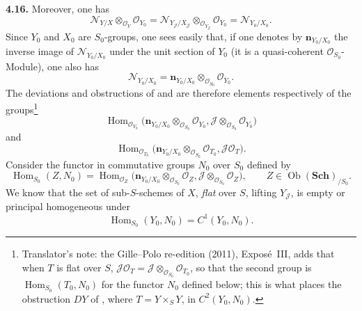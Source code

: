 \medskip
\noindent{}\textbf{4.16.}
Moreover, one has
\[
 \mathscr N_{Y/X}\otimes_{\mathscr O_Y}\mathscr O_{Y_0}
 =\mathscr N_{Y_{\mathscr J}/X_{\mathscr J}}
   \otimes_{\mathscr O_{Y_{\mathscr J}}}\mathscr O_{Y_0}
 =\mathscr N_{Y_0/X_0}.
\]
Since \(Y_0\) and \(X_0\) are \(S_0\)-groups, one sees easily that, if
one denotes by \(\mathbf n_{Y_0/X_0}\) the inverse image of
\(\mathscr N_{Y_0/X_0}\) under the unit section of \(Y_0\) (it is a
quasi-coherent \(\mathscr O_{S_0}\)-Module), one also has
\[
 \mathscr N_{Y_0/X_0}
 =\mathbf n_{Y_0/X_0}\otimes_{\mathscr O_{S_0}}\mathscr O_{Y_0}.
\]
The deviations and obstructions of  and  are
therefore elements respectively of the groups\footnote{Translator's note: the Gille--Polo re-edition (2011), Exposé~III, adds
that when \(T\) is flat over \(S\), \(\mathscr J\mathscr O_T=\mathscr J
\otimes_{\mathscr O_{S_0}}\mathscr O_{T_0}\), so that the second group is
\(\operatorname{Hom}_{S_0}(T_0,N_0)\) for the functor \(N_0\) defined below; this
is what places the obstruction \(DY\) of , where
\(T=Y\times_SY\), in \(C^2(Y_0,N_0)\).}
\[
 \operatorname{Hom}_{\mathscr O_{Y_0}}
 \bigl(\mathbf n_{Y_0/X_0}\otimes_{\mathscr O_{S_0}}\mathscr O_{Y_0},
       \mathscr J\otimes_{\mathscr O_{S_0}}\mathscr O_{Y_0}\bigr)
\]
and
\[
 \operatorname{Hom}_{\mathscr O_{T_0}}
 \bigl(\mathbf n_{Y_0/X_0}\otimes_{\mathscr O_{S_0}}\mathscr O_{T_0},
       \mathscr J\mathscr O_T\bigr).
\]
Consider the functor in commutative groups \(N_0\) over \(S_0\) defined
by
\[
 \operatorname{Hom}_{S_0}(Z,N_0)
 =\operatorname{Hom}_{\mathscr O_Z}
 \bigl(\mathbf n_{Y_0/X_0}\otimes_{\mathscr O_{S_0}}\mathscr O_Z,
       \mathscr J\otimes_{\mathscr O_{S_0}}\mathscr O_Z\bigr),
 \qquad Z\in\operatorname{Ob}(\mathbf{Sch})_{/S_0}.
\]
We know that the set of sub-\(S\)-schemes of \(X\), \emph{flat} over
\(S\), lifting \(Y_{\mathscr J}\), is empty or principal homogeneous
under
\[
 \operatorname{Hom}_{S_0}(Y_0,N_0)=C^1(Y_0,N_0).
\]
